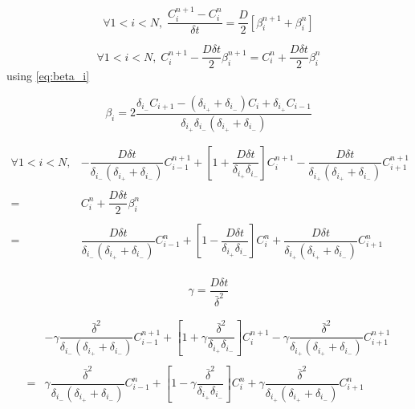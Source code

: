 \documentclass[aps,11pt]{revtex4}
\begin{document}
\begin{equation}
\forall 1<i<N, \; \dfrac{C_i^{n+1}-C_i^{n}}{\delta t} = \dfrac{D}{2} \left[ \beta_i^{n+1} + \beta_i^{n}\right]
\end{equation}

\begin{equation}
\forall 1<i<N, \;  C_i^{n+1} - \dfrac{D\delta t}{2} \beta_i^{n+1} = C_i^{n} +  \dfrac{D\delta t}{2} \beta_i^{n}
\end{equation}
using \eqref{eq:beta_i}

$$
		\beta_i = 2\dfrac{ \delta_{i_-} C_{i+1}  - (\delta_{i_+}+\delta_{i_-})C_i + \delta_{i_+} C_{i-1} }{ \delta_{i_+}\delta_{i_-}(\delta_{i_+}+\delta_{i_-})  }
$$

\begin{equation}
\begin{array}{rl}
\forall 1<i<N, &  
- \dfrac{D\delta t}{\delta_{i_-}(\delta_{i_+}+\delta_{i_-})} C_{i-1}^{n+1} + \left[1+\dfrac{D\delta t}{\delta_{i_+}\delta_{i_-}}\right] C_i^{n+1} - \dfrac{D\delta t}{\delta_{i_+}(\delta_{i_+}+\delta_{i_-})}C_{i+1}^{n+1}\\
\\
 = & C_i^{n} +  \dfrac{D\delta t}{2} \beta_i^{n}\\
 \\
 = & \dfrac{D\delta t}{\delta_{i_-}(\delta_{i_+}+\delta_{i_-})} C_{i-1}^{n} 
 +\left[1-\dfrac{D\delta t}{\delta_{i_+}\delta_{i_-}}\right] C_i^{n}
 +\dfrac{D\delta t}{\delta_{i_+}(\delta_{i_+}+\delta_{i_-})}C_{i+1}^{n}\\
 \end{array}
 \end{equation}

\begin{equation}
	\gamma = \dfrac{D\delta t}{\bar{\delta}^2}
\end{equation}

\begin{equation}
\begin{array}{rl}
 & - \gamma\dfrac{\bar{\delta}^2}{\delta_{i_-}(\delta_{i_+}+\delta_{i_-})} C_{i-1}^{n+1} + \left[1+\gamma\dfrac{\bar{\delta}^2}{\delta_{i_+}\delta_{i_-}}\right] C_i^{n+1} - \gamma\dfrac{\bar{\delta}^2}{\delta_{i_+}(\delta_{i_+}+\delta_{i_-})}C_{i+1}^{n+1}\\
 \\
 = & \gamma\dfrac{\bar{\delta}^2}{\delta_{i_-}(\delta_{i_+}+\delta_{i_-})} C_{i-1}^{n} 
 +\left[1-\gamma\dfrac{\bar{\delta}^2}{\delta_{i_+}\delta_{i_-}}\right] C_i^{n}
 +\gamma\dfrac{\bar{\delta}^2}{\delta_{i_+}(\delta_{i_+}+\delta_{i_-})}C_{i+1}^{n}\\
 \end{array}
\end{equation}
\end{document}
